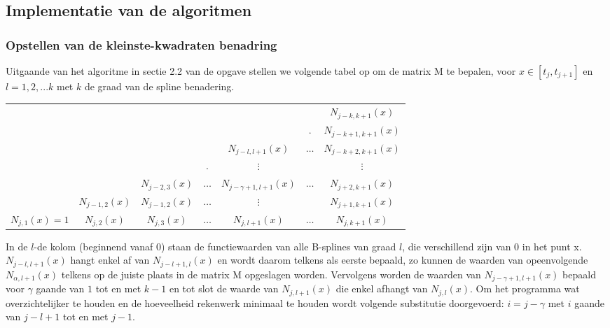 \documentclass[a4paper]{article}
\begin{document}
\subsection{Implementatie van de algoritmen}
\subsubsection{Opstellen van de kleinste-kwadraten benadring}
Uitgaande van het algoritme in sectie 2.2 van de opgave stellen we volgende tabel op om de matrix M te bepalen, voor $x \in [t_j, t_{j+1}]$ en $l=1, 2, ... k$ met $k$ de graad van de spline benadering.
\begin{table}[H]
	\centering
	\begin{tabular}{| c c c c c c c  |}
		\hline
		& & & & & & $N_{j-k,k+1}(x)$ \\
		& & & & & . & $N_{j-k+1,k+1}(x)$ \\
		& & & & $N_{j-l,l+1}(x)$ & $\hdots$ & $N_{j-k+2,k+1}(x)$ \\
		& & & . & $\vdots$  & & $\vdots$\\
		& & $N_{j-2,3}(x)$ & $\hdots$ & $N_{j-\gamma+1,l+1}(x)$ & $\hdots$ & $N_{j+2,k+1}(x)$   \\
		& $N_{j-1,2}(x)$ & $N_{j-1,2}(x)$ & $\hdots$ & $\vdots$ &  &$N_{j+1,k+1}(x)$ \\
		$N_{j,1}(x) = 1$ & $N_{j,2}(x)$ & $N_{j,3}(x)$ & $\hdots$ & $N_{j,l+1}(x)$ & $\hdots$ & $N_{j,k+1}(x)$ \\ 
		\hline
	\end{tabular}
\end{table}
In de $l$-de kolom (beginnend vanaf 0) staan de functiewaarden van alle B-splines van graad $l$, die verschillend zijn van 0 in het punt x. 
$N_{j-l,l+1}(x)$ hangt enkel af van $N_{j-l+1,l}(x)$ en wordt daarom telkens als eerste bepaald, zo kunnen de  waarden van opeenvolgende $N_{\alpha,l+1}(x)$ telkens op de juiste plaats in de matrix M opgeslagen worden. Vervolgens worden de waarden van $N_{j-\gamma+1,l+1}(x)$ bepaald voor $\gamma$ gaande van $1$ tot en met $k-1$ en tot slot de waarde van $N_{j,l+1}(x)$ die enkel afhangt van $N_{j,l}(x)$. Om het programma wat overzichtelijker te houden en de hoeveelheid rekenwerk minimaal te houden wordt volgende substitutie doorgevoerd: $i=j-\gamma$ met $i$ gaande van $j-l+1$ tot en met $j-1$.
\newpage

\newpage
\end{document}
